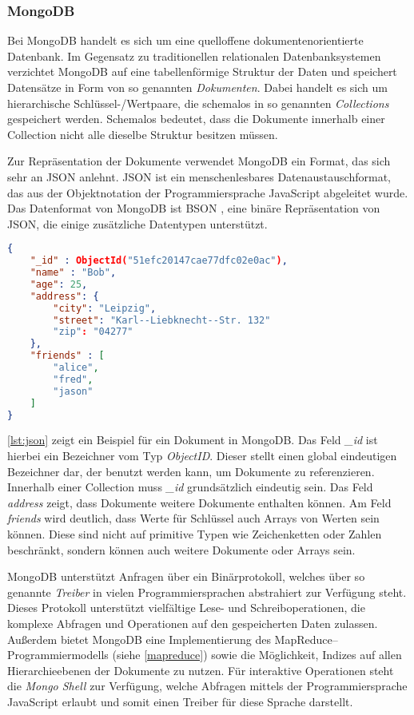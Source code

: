 \subsubsection{MongoDB}
\label{mongo}

Bei MongoDB handelt es sich um eine quelloffene dokumentenorientierte Datenbank. Im Gegensatz zu traditionellen relationalen Datenbanksystemen verzichtet MongoDB auf eine tabellenförmige Struktur der Daten und speichert Datensätze in Form von so genannten \emph{Dokumenten}. Dabei handelt es sich um hierarchische Schlüssel-/Wertpaare, die schemalos in so genannten \emph{Collections} gespeichert werden. Schemalos bedeutet, dass die Dokumente innerhalb einer Collection nicht alle dieselbe Struktur besitzen müssen.

Zur Repräsentation der Dokumente verwendet MongoDB ein Format, das sich sehr an JSON \cite{json2006} anlehnt. JSON ist ein menschenlesbares Datenaustauschformat, das aus der Objektnotation der Programmiersprache JavaScript abgeleitet wurde. Das Datenformat von MongoDB ist BSON \cite{bson2013}, eine binäre Repräsentation von JSON, die einige zusätzliche Datentypen unterstützt. 

\begin{lstlisting}[language=json, label={lst:json}, caption={JSON--Beispiel für ein Dokument in MongoDB}, float=ht]
{
    "_id" : ObjectId("51efc20147cae77dfc02e0ac"),
    "name" : "Bob",
    "age": 25,
    "address": {
        "city": "Leipzig",
        "street": "Karl--Liebknecht--Str. 132"
        "zip": "04277"
    },
    "friends" : [
        "alice",
        "fred",
        "jason"
    ]
}
\end{lstlisting}

\cref{lst:json} zeigt ein Beispiel für ein Dokument in MongoDB. Das Feld \emph{\_id} ist hierbei ein  Bezeichner vom Typ \emph{ObjectID}. Dieser stellt einen global eindeutigen Bezeichner dar, der benutzt werden kann, um Dokumente zu referenzieren. Innerhalb einer Collection muss \emph{\_id} grundsätzlich eindeutig sein. Das Feld \emph{address} zeigt, dass Dokumente weitere Dokumente enthalten können. Am Feld \emph{friends} wird deutlich, dass Werte für Schlüssel auch Arrays von Werten sein können. Diese sind nicht auf primitive Typen wie Zeichenketten oder Zahlen beschränkt, sondern können auch weitere Dokumente oder Arrays sein.

MongoDB unterstützt Anfragen über ein Binärprotokoll, welches über so genannte \emph{Treiber} in vielen Programmiersprachen abstrahiert zur Verfügung steht. Dieses Protokoll unterstützt vielfältige Lese- und Schreiboperationen, die komplexe Abfragen und Operationen auf den gespeicherten Daten zulassen. Außerdem bietet MongoDB eine Implementierung des MapReduce--Programmiermodells (siehe \cref{mapreduce}) sowie die Möglichkeit, Indizes auf allen Hierarchieebenen der Dokumente zu nutzen. Für interaktive Operationen steht die \emph{Mongo Shell} zur Verfügung, welche Abfragen mittels der Programmiersprache JavaScript erlaubt und somit einen Treiber für diese Sprache darstellt.

